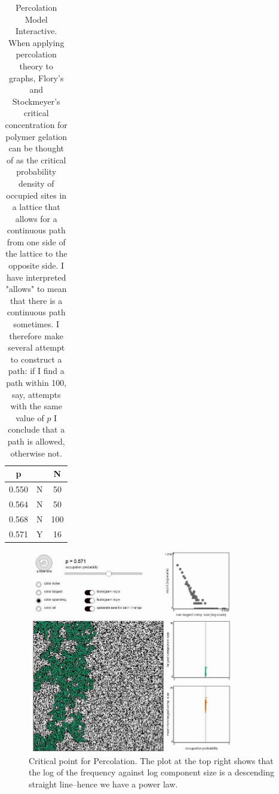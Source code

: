 \documentclass[]{article}
\begin{document}
\begin{table}[H]
	\begin{center}
		\caption{Percolation Model Interactive. When applying percolation theory to graphs, Flory's and Stockmeyer's critical concentration for polymer gelation can be thought of as the critical probability density of occupied sites in a lattice that allows for a continuous path from one side of the lattice to the opposite side.
			I have interpreted "allows" to mean that there is a continuous path sometimes. I therefore make several attempt to construct a path: if I find a path within 100, say, attempts with the same value of $p$ I conclude that a path is allowed, otherwise not.  }\label{table:percolation}
		\begin{tabular}{|c|c|c|}\hline
			p&&N\\ \hline
			0.550&N&50\\ \hline
			0.564&N&50\\ \hline
			0.568&N&100\\ \hline
			0.571&Y&16\\ \hline
		\end{tabular}
	\end{center}
\end{table}

\begin{figure}[H]
	\begin{center}
		\caption{Critical point for Percolation. The plot at the top right shows that  the log of the frequency against log component size is a descending straight line--hence we have a power law.}\label{fig:percolation}
		\includegraphics[width=0.8\textwidth]{percolation}
	\end{center}
\end{figure}
\end{document}

